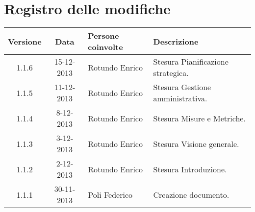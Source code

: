 \section*{Registro delle modifiche}

\begin{tabularx}{\textwidth}{|c|c|p{3.5cm}|X|}
 \hline \textbf{Versione} & \textbf{Data} & \textbf{Persone coinvolte} & \textbf{Descrizione} \\
 \hline 1.1.6 & 15-12-2013 & Rotundo Enrico & Stesura Pianificazione strategica. \\
 \hline 1.1.5 & 11-12-2013 & Rotundo Enrico & Stesura Gestione amministrativa. \\
 \hline 1.1.4 & 8-12-2013 & Rotundo Enrico & Stesura Misure e Metriche. \\
 \hline 1.1.3 & 3-12-2013 & Rotundo Enrico & Stesura Visione generale. \\
 \hline 1.1.2 & 2-12-2013 & Rotundo Enrico & Stesura Introduzione. \\
 \hline 1.1.1 & 30-11-2013 & Poli Federico & Creazione documento.\\
 \hline
\end{tabularx}
